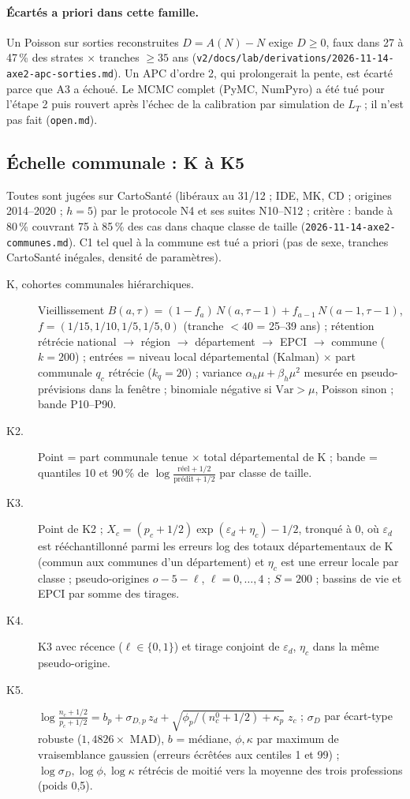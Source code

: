 \paragraph{Écartés a priori dans cette famille.} Un Poisson sur sorties reconstruites $D = A(N) - N$ exige
$D \ge 0$, faux dans 27 à 47\,\%\mesure{} des strates $\times$ tranches $\ge 35$ ans
(\texttt{v2/docs/lab/derivations/2026-11-14-axe2-apc-sorties.md}). Un APC d'ordre 2, qui prolongerait la
pente, est écarté parce que A3 a échoué. Le MCMC complet (PyMC, NumPyro) a été tué pour l'étape 2 puis
rouvert après l'échec de la calibration par simulation de $L_T$ ; il n'est pas fait (\texttt{open.md}).

\subsection{Échelle communale : K à K5}
\label{met:communes}
Toutes sont jugées sur CartoSanté (libéraux au 31/12 ; IDE, MK, CD ; origines 2014--2020 ; $h = 5$) par le
protocole N4 et ses suites N10--N12 ; critère : bande à 80\,\% couvrant 75 à 85\,\% des cas dans chaque
classe de taille (\texttt{2026-11-14-axe2-communes.md}). C1 tel quel à la commune est tué a priori (pas de
sexe, tranches CartoSanté inégales, densité de paramètres).
\begin{description}
  \item[K, cohortes communales hiérarchiques.] Vieillissement
    $B(a,\tau) = (1 - f_a)\,N(a,\tau-1) + f_{a-1}\,N(a-1,\tau-1)$,
    $f = (1/15, 1/10, 1/5, 1/5, 0)$ (tranche $<40$ = 25--39 ans\suppose) ; rétention rétrécie
    national $\to$ région $\to$ département $\to$ EPCI $\to$ commune ($k = 200$\suppose) ; entrées = niveau
    local départemental (Kalman) $\times$ part communale $q_c$ rétrécie ($k_q = 20$\suppose) ; variance
    $\alpha_h\mu + \beta_h\mu^2$ mesurée en pseudo-prévisions dans la fenêtre ; binomiale négative si
    $\mathrm{Var} > \mu$, Poisson sinon ; bande P10--P90.
  \item[K2.] Point = part communale tenue $\times$ total départemental de K ; bande = quantiles 10 et 90\,\%
    de $\log\frac{\text{réel}+1/2}{\text{prédit}+1/2}$ par classe de taille.
  \item[K3.] Point de K2 ; $X_c = (p_c + 1/2)\exp(\varepsilon_d + \eta_c) - 1/2$, tronqué à 0, où
    $\varepsilon_d$ est rééchantillonné parmi les erreurs log des totaux départementaux de K (commun aux
    communes d'un département) et $\eta_c$ est une erreur locale par classe ; pseudo-origines
    $o - 5 - \ell$, $\ell = 0,\dots,4$ ; $S = 200$ ; bassins de vie et EPCI par somme des tirages.
  \item[K4.] K3 avec récence ($\ell \in \{0, 1\}$) et tirage conjoint de $\varepsilon_d$, $\eta_c$ dans la
    même pseudo-origine.
  \item[K5.] $\log\frac{n_c + 1/2}{p_c + 1/2} = b_p + \sigma_{D,p}\,z_d + \sqrt{\phi_p/(n^0_c + 1/2) + \kappa_p}\;z_c$ ;
    $\sigma_D$ par écart-type robuste ($1{,}4826\times$ MAD), $b$ = médiane, $\phi, \kappa$ par maximum de
    vraisemblance gaussien (erreurs écrêtées aux centiles 1 et 99) ; $\log\sigma_D, \log\phi, \log\kappa$
    rétrécis de moitié vers la moyenne des trois professions (poids 0,5\suppose).
\end{description}

